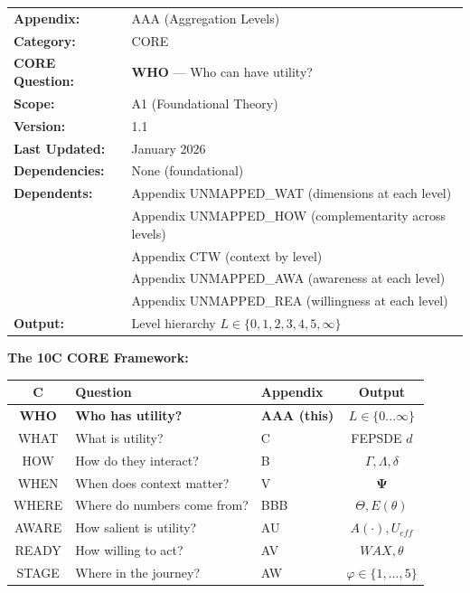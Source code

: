 \begin{tcolorbox}[colback=red!5!white, colframe=red!75!black, 
    title=\textbf{CORE Appendix: Aggregation Levels}]

\begin{tabular}{@{}ll@{}}
\textbf{Appendix:} & AAA (Aggregation Levels) \\
\textbf{Category:} & CORE \\
\textbf{CORE Question:} & \textbf{WHO} --- Who can have utility? \\
\textbf{Scope:} & A1 (Foundational Theory) \\
\textbf{Version:} & 1.1 \\
\textbf{Last Updated:} & January 2026 \\
\textbf{Dependencies:} & None (foundational) \\
\textbf{Dependents:} & Appendix UNMAPPED_WAT (dimensions at each level) \\
 & Appendix UNMAPPED_HOW (complementarity across levels) \\
 & Appendix CTW (context by level) \\
 & Appendix UNMAPPED_AWA (awareness at each level) \\
 & Appendix UNMAPPED_REA (willingness at each level) \\
\textbf{Output:} & Level hierarchy $L \in \{0, 1, 2, 3, 4, 5, \infty\}$ \\
\end{tabular}

\vspace{0.3cm}

\textbf{The 10C CORE Framework:}
\begin{center}
\small
\begin{tabular}{@{}cllc@{}}
\toprule
\textbf{C} & \textbf{Question} & \textbf{Appendix} & \textbf{Output} \\
\midrule
\textbf{WHO} & \textbf{Who has utility?} & \textbf{AAA (this)} & $L \in \{0...\infty\}$ \\
WHAT & What is utility? & C & FEPSDE $d$ \\
HOW & How do they interact? & B & $\Gamma, \Lambda, \delta$ \\
WHEN & When does context matter? & V & $\boldsymbol{\Psi}$ \\
WHERE & Where do numbers come from? & BBB & $\Theta, E(\theta)$ \\
\midrule
AWARE & How salient is utility? & AU & $A(\cdot), U_{eff}$ \\
READY & How willing to act? & AV & $WAX, \theta$ \\
STAGE & Where in the journey? & AW & $\varphi \in \{1,...,5\}$ \\
\bottomrule
\end{tabular}
\end{center}

\end{tcolorbox}

